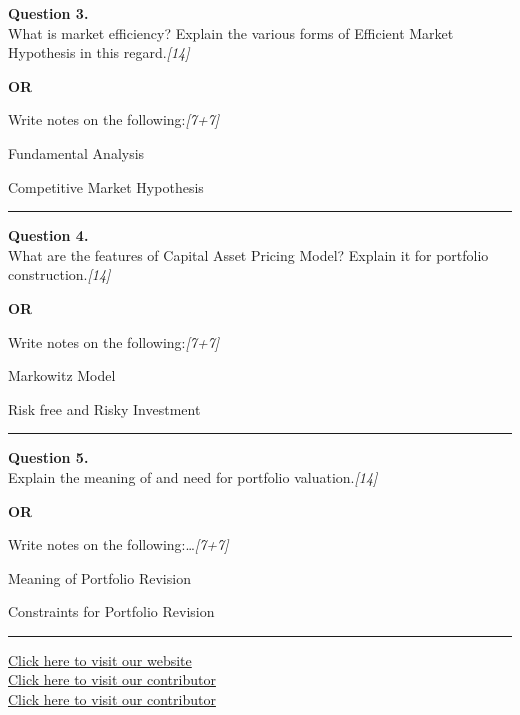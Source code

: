 \documentclass[11pt,a4paper]{article}
\newcommand{\pts}[1]{\hfill   \textit{[#1]}}
\begin{document}
\noindent   \textbf{Question 3.} \\
What is market efficiency? Explain the various forms of Efficient Market Hypothesis in this regard.\pts{14}

\centerline{   \textbf{OR}}

Write notes on the following:\pts{7+7}

\begin{parts}
  \item Fundamental Analysis
  \item Competitive Market Hypothesis
\end{parts}

\medskip\rule{\linewidth}{0.2pt}




\noindent   \textbf{Question 4.} \\
What are the features of Capital Asset Pricing Model? Explain it for portfolio construction.\pts{14}

\centerline{   \textbf{OR}}

Write notes on the following:\pts{7+7}

\begin{parts}
  \item Markowitz Model
  \item Risk free and Risky Investment
\end{parts}

\medskip\rule{\linewidth}{0.2pt}




\noindent   \textbf{Question 5.} \\
Explain the meaning of and need for portfolio valuation.\pts{14}

\centerline{   \textbf{OR}}

Write notes on the following:\dots\pts{7+7}

\begin{parts}
  \item Meaning of Portfolio Revision
  \item Constraints for Portfolio Revision
\end{parts}

\vfill
\rule{\linewidth}{0.4pt}

\begin{center}\small
\href{https://bhu-exam.vercel.app/}{Click here to visit our website}\\[4pt]
\href{https://me-aryan.vercel.app/}{Click here to visit our contributor}\\[4pt]
\href{https://quashan-me.vercel.app/}{Click here to visit our contributor}
\end{center}
\end{document}

